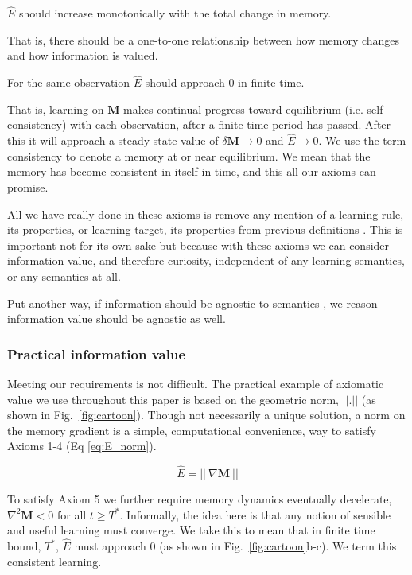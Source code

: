 \begin{axiom}
	$\hat E$ should increase monotonically with the total change in memory. 
\end{axiom}

That is, there should be a one-to-one relationship between how memory changes and how information is valued.

\begin{axiom}
	For the same observation $\hat E$ should approach 0 in finite time.
\end{axiom}

That is, learning on $\mathbf{M}$ makes continual progress toward equilibrium (i.e. self-consistency) with each observation, after a finite time period has passed. After this it will approach a steady-state value of $\delta \mathbf{M} \rightarrow 0$ and $\hat E \rightarrow 0$. We use the term consistency to denote a memory at or near equilibrium. We mean that the memory has become consistent in itself in time, and this all our axioms can promise. 

All we have really done in these axioms is remove any mention of a learning rule, its properties, or learning target, its properties from previous definitions \cite{Itti2009,Jaegle2019,Schmidhuber1991,Inglis2001,Reddy2016,Pirolli2007}. This is important not for its own sake but because with these axioms we can consider information value, and therefore curiosity, independent of any learning semantics, or any semantics at all. 

Put another way, if information should be agnostic to semantics \cite{Shannon1948a}, we reason information value should be agnostic as well.


\subsubsection*{Practical information value}
Meeting our requirements is not difficult. The practical example of axiomatic value we use throughout this paper is based on the geometric norm, $||.||$ (as shown in Fig.~\ref{fig:cartoon}). Though not necessarily a unique solution, a norm on the memory gradient is a simple, computational convenience, way to satisfy Axioms 1-4 (Eq \ref{eq:E_norm}). 

\begin{equation}
	\label{eq:E_norm}
	\hat E = || \ \nabla \mathbf{M} \ ||
\end{equation}

To satisfy Axiom 5 we further require memory dynamics eventually decelerate,  $\nabla^2 \mathbf{M} < 0$ for all $ t \ge T^*$. Informally, the idea here is that any notion of sensible and useful learning must converge. We take this to mean that in finite time bound, $T^*$, $\hat E$ must approach 0 (as shown in Fig.~\ref{fig:cartoon}b-c). We term this consistent learning.

